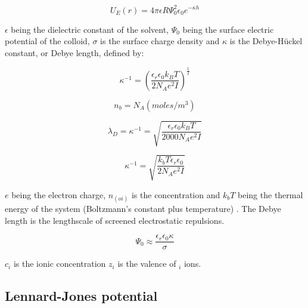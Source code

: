 \begin{equation} %
U_E (r) = 4\pi\epsilon R \Psi^2_{0} \epsilon_0 e^{-\kappa h}
\end{equation}

$\epsilon$ being the dielectric constant of the solvent, $\Psi_0$ being the surface electric potential of the colloid, $\sigma$ is the surface charge density and $\kappa$ is the Debye-H\"uckel constant, or Debye length, defined by:

\begin{equation} %
\kappa^{-1} = \left(\frac{\epsilon_r \epsilon_0 k_B T}{2 N_A e^2 I}\right)^\frac{1}{2}
\label{eqn:debye} %
\end{equation} %

\begin{equation}
n_b = N_A (moles /m^3)
\end{equation}

\begin{equation}
\lambda_D = \kappa^{-1} = \sqrt{ \frac{ \epsilon_r \epsilon_0 k_B T}{2000N_A e^2 I}}
\end{equation} %

\begin{equation}
\kappa^{-1} = \sqrt{ \frac{ k_b T \epsilon_r \epsilon_0}{2 N_A e^2 I}}
\end{equation}

$e$ being the electron charge, $n_(oi)$ is the concentration and $k_bT$ being the thermal energy of the system (Boltzmann's constant plus temperature) \cite{boltzmann}. The Debye length is the lengthscale of screened electrostatic repulsions.\cite{?}



\begin{equation} %
\Psi_0 \approx \frac{\epsilon_r \epsilon_0 \kappa}{\sigma}
\end{equation}


$c_i$ is the ionic concentration $z_i$ is the valence of $_i$ ions.

\subsection{Lennard-Jones potential} %

